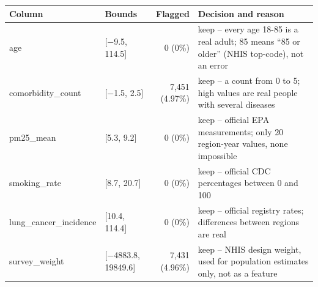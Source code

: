 \begin{tabularx}{\textwidth}{l l r >{\raggedright\arraybackslash}X}
\toprule
Column & Bounds & Flagged & Decision and reason \\
\midrule
age & [$-$9.5, 114.5] & 0 (0\%) & keep -- every age 18-85 is a real adult; 85 means ``85 or older'' (NHIS top-code), not an error \\
comorbidity\_count & [$-$1.5, 2.5] & 7,451 (4.97\%) & keep -- a count from 0 to 5; high values are real people with several diseases \\
pm25\_mean & [5.3, 9.2] & 0 (0\%) & keep -- official EPA measurements; only 20 region-year values, none impossible \\
smoking\_rate & [8.7, 20.7] & 0 (0\%) & keep -- official CDC percentages between 0 and 100 \\
lung\_cancer\_incidence & [10.4, 114.4] & 0 (0\%) & keep -- official registry rates; differences between regions are real \\
survey\_weight & [$-$4883.8, 19849.6] & 7,431 (4.96\%) & keep -- NHIS design weight, used for population estimates only, not as a feature \\
\bottomrule
\end{tabularx}
